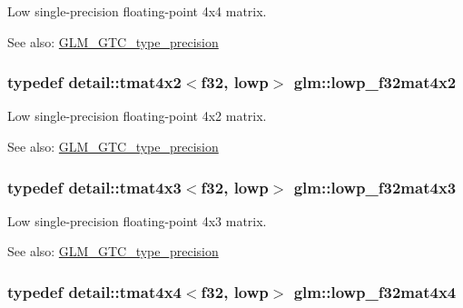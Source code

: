 Low single-precision floating-point 4x4 matrix. \begin{Desc}
\item[See also:]\hyperlink{group__gtc__type__precision}{GLM\_\-GTC\_\-type\_\-precision} \end{Desc}
\hypertarget{group__gtc__type__precision_g6eedee3981e5bf150ad7463786d0d694}{
\subsubsection[lowp\_\-f32mat4x2]{\setlength{\rightskip}{0pt plus 5cm}typedef detail::tmat4x2$<$f32, lowp$>$ {\bf glm::lowp\_\-f32mat4x2}}}
\label{group__gtc__type__precision_g6eedee3981e5bf150ad7463786d0d694}


Low single-precision floating-point 4x2 matrix. \begin{Desc}
\item[See also:]\hyperlink{group__gtc__type__precision}{GLM\_\-GTC\_\-type\_\-precision} \end{Desc}
\hypertarget{group__gtc__type__precision_gdd0ff5b09c6ecac83e4e908e3f6478c7}{
\subsubsection[lowp\_\-f32mat4x3]{\setlength{\rightskip}{0pt plus 5cm}typedef detail::tmat4x3$<$f32, lowp$>$ {\bf glm::lowp\_\-f32mat4x3}}}
\label{group__gtc__type__precision_gdd0ff5b09c6ecac83e4e908e3f6478c7}


Low single-precision floating-point 4x3 matrix. \begin{Desc}
\item[See also:]\hyperlink{group__gtc__type__precision}{GLM\_\-GTC\_\-type\_\-precision} \end{Desc}
\hypertarget{group__gtc__type__precision_gb7a6454e1f5d5c434ff316b139eb0231}{
\subsubsection[lowp\_\-f32mat4x4]{\setlength{\rightskip}{0pt plus 5cm}typedef detail::tmat4x4$<$f32, lowp$>$ {\bf glm::lowp\_\-f32mat4x4}}}
\label{group__gtc__type__precision_gb7a6454e1f5d5c434ff316b139eb0231}


